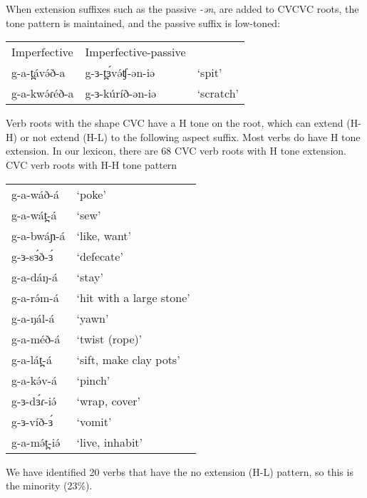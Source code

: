 When extension suffixes such as the passive \textit{-ən}, are added to CVCVC roots, the tone pattern is maintained, and the passive suffix is low-toned: %

\ea 
\begin{tabular}[t]{lll}
Imperfective	&	Imperfective-passive	\\
g-a-t̪ávə́ð-a	&	g-ɜ-t̪ɜ́və́ʧ-ən-iə	&	‘spit’\\
g-a-kwə́ɾéð-a	&	g-ɜ-kúríð-ən-iə	&	‘scratch’ \\	
\end{tabular}
\z 


Verb roots with the shape CVC have a H tone on the root, which can extend (H-H) or not extend (H-L) to the following aspect suffix. Most verbs do have H tone extension. In our lexicon, there are 68 CVC verb roots with H tone extension.
\ea CVC verb roots with H-H tone pattern
\begin{tabular}[t]{ll}
g-a-wáð-á	&	‘poke’\\
g-a-wát̪-á	&	‘sew’\\
g-a-bwáɲ-á	&	‘like, want'\\
g-ɜ-sɜ́ð-ɜ́	&	‘defecate’\\
g-a-dáŋ-á	&	‘stay’\\
g-a-rə́m-á	&	‘hit with a large stone’\\
g-a-ŋál-á	&	‘yawn’\\
g-a-méð-á	&	‘twist (rope)’\\
g-a-lát̪-á	&	‘sift, make clay pots’\\
g-a-kə́v-á	&	‘pinch’\\
g-ɜ-dɜ́ɾ-iə́	&	‘wrap, cover’\\
g-ɜ-víð-ɜ́	&	‘vomit’\\
g-a-mə́t̪-iə́	&	‘live, inhabit’\\ 
\end{tabular}
\z 
We have identified 20 verbs that have the no extension (H-L) pattern, so this is the minority (23\%). 

